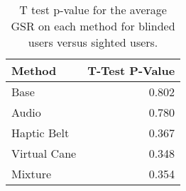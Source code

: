 
\begin{table}[!htb]
\centering
\caption{T test p-value for the average GSR on each method for blinded users versus sighted users.}
\label{tab:ttest_gsr}
\begin{tabular}{lr}
\toprule
      Method &  T-Test P-Value \\
\midrule
        Base &           0.802 \\
       Audio &           0.780 \\
 Haptic Belt &           0.367 \\
Virtual Cane &           0.348 \\
     Mixture &           0.354 \\
\bottomrule
\end{tabular}
\end{table}

